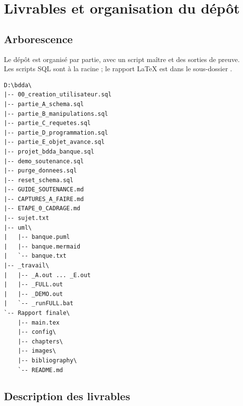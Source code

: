 \chapter{Livrables et organisation du dépôt}
\label{ann:livrables}

\section{Arborescence}

Le dépôt est organisé par partie, avec un script maître et des sorties de
preuve. Les scripts SQL sont à la racine ; le rapport LaTeX est dans le
sous-dossier .

\begin{lstlisting}[caption={Organisation des fichiers du projet.},label={lst:arborescence},language={}]
D:\bdda\
|-- 00_creation_utilisateur.sql
|-- partie_A_schema.sql
|-- partie_B_manipulations.sql
|-- partie_C_requetes.sql
|-- partie_D_programmation.sql
|-- partie_E_objet_avance.sql
|-- projet_bdda_banque.sql
|-- demo_soutenance.sql
|-- purge_donnees.sql
|-- reset_schema.sql
|-- GUIDE_SOUTENANCE.md
|-- CAPTURES_A_FAIRE.md
|-- ETAPE_0_CADRAGE.md
|-- sujet.txt
|-- uml\
|   |-- banque.puml
|   |-- banque.mermaid
|   `-- banque.txt
|-- _travail\
|   |-- _A.out ... _E.out
|   |-- _FULL.out
|   |-- _DEMO.out
|   `-- _runFULL.bat
`-- Rapport finale\
    |-- main.tex
    |-- config\
    |-- chapters\
    |-- images\
    |-- bibliography\
    `-- README.md
\end{lstlisting}

\section{Description des livrables}

